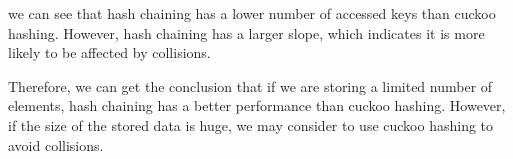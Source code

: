 \documentclass{article}
\begin{document}
\begin{spacing}{1.2}
we can see that hash chaining has a lower number of accessed keys than cuckoo hashing. However, hash chaining has a larger slope, which indicates it is more likely to be affected by collisions.

Therefore, we can get the conclusion that if we are storing a limited number of elements, hash chaining has a better performance than cuckoo hashing. However, if the size of the stored data is huge, we may consider to use cuckoo hashing to avoid collisions.
\end{spacing}
\end{document}
